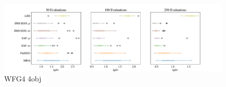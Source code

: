 \documentclass[
dvipsnames, table,   %
format=acmsmall,     %
anonymous=true,      %
authorversion=false, %
]{acmart}
\begin{document}
\begin{figure}[h]
    \centering
    \includegraphics[width=\textwidth]{figures/wfg4_4obj_8dim_igd_boxplot.pdf}
    \caption{WFG4 4obj}
    \label{fig:boxplot WFG4_4obj_8dim}
\end{figure}
\end{document}
